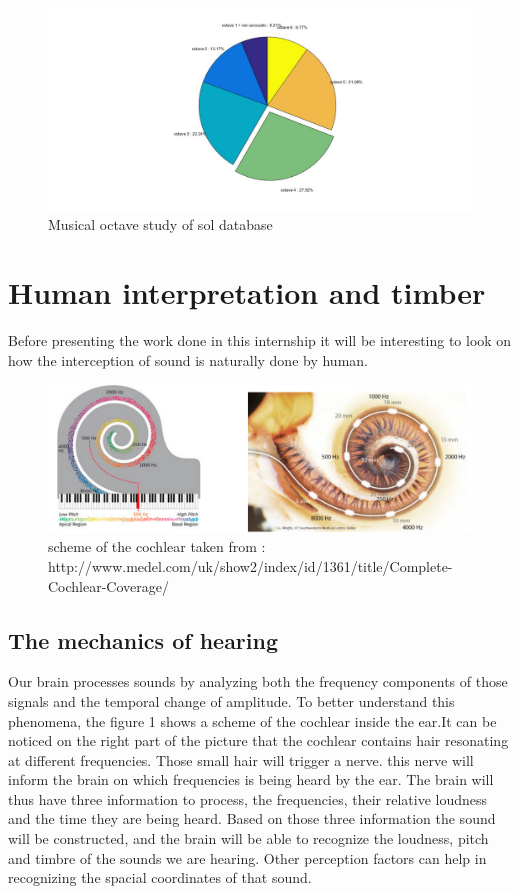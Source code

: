 \documentclass[hidelinks,12pt]{report}
\begin{document}
\begin{figure}[t!]
  
  \centering
	    \includegraphics[width=1\textwidth]{byoctave}
    \caption{Musical octave study of sol database}
\end{figure}


\section{Human interpretation and timber}

Before presenting the work done in this internship it will be interesting to look on how the interception of sound is naturally done by human.\par
\begin{figure}[t!]
  
  \centering
	    \includegraphics[width=1\textwidth]{cochlear}
    \caption{scheme of the cochlear taken from : http://www.medel.com/uk/show2/index/id/1361/title/Complete-Cochlear-Coverage/}
\end{figure}
\subsection{The mechanics of hearing}
Our brain processes sounds by analyzing both the frequency components of those signals and the temporal change of amplitude. To better understand this phenomena, the figure 1 shows a scheme of the cochlear inside the ear.It can be noticed on the right part of the picture that the cochlear contains hair resonating  at different frequencies. Those small hair will trigger a nerve. this nerve will inform the brain on which frequencies is being heard by the ear. The brain will thus have three information to process, the frequencies, their relative loudness and the time they are being heard. Based on those three information the sound will be constructed, and the brain will be able to   
recognize the loudness, pitch and timbre of the sounds we are hearing. Other perception factors can help in recognizing the spacial coordinates  of that sound.
\end{document}
